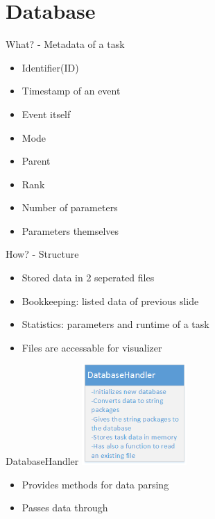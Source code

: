 \section{Database}


	\begin{frame}{What? - Metadata of a task}
		\begin{itemize}
		\item Identifier(ID)
		\item Timestamp of an event
		\item Event itself
		\item Mode
		\item Parent
		\item Rank
		\item Number of parameters
		\item Parameters themselves
		\end{itemize}
	\end{frame}
	
	\begin{frame}{How? - Structure}
		\begin{itemize}
		\item Stored data in 2 seperated files
		\item Bookkeeping: listed data of previous slide
		\item Statistics: parameters and runtime of a task
		\item Files are accessable for visualizer
		\end{itemize}
	\end{frame}
	\begin{frame}{DatabaseHandler}
	\includegraphics[width=0.3\textwidth]{images/databasehandler.png}
	\begin{itemize}
		\item Provides methods for data parsing
		\item Passes data through
		
	\end{itemize}
	\end{frame}
	
